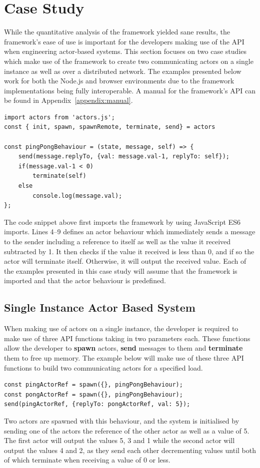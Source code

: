 \documentclass[oneside]{um-fict}
\begin{document}
\section{Case Study}
While the quantitative analysis of the framework yielded sane results, the framework's ease of use is important for the developers making use of the API when engineering actor-based systems. This section focuses on two case studies which make use of the framework to create two communicating actors on a single instance as well as over a distributed network. The examples presented below work for both the Node.js and browser environments due to the framework implementations being fully interoperable. A manual for the framework's API can be found in Appendix~\ref{appendix:manual}.
\newpage
\begin{lstlisting}    
import actors from 'actors.js';
const { init, spawn, spawnRemote, terminate, send} = actors

const pingPongBehaviour = (state, message, self) => {
    send(message.replyTo, {val: message.val-1, replyTo: self});
    if(message.val-1 < 0)
        terminate(self)
    else    
        console.log(message.val);
};
\end{lstlisting}
The code snippet above first imports the framework by using JavaScript ES6 imports. Lines 4--9 defines an actor behaviour which immediately sends a message to the sender including a reference to itself as well as the value it received subtracted by 1. It then checks if the value it received is less than 0, and if so the actor will terminate itself. Otherwise, it will output the received value. Each of the examples presented in this case study will assume that the framework is imported and that the actor behaviour is predefined. 
\subsection{Single Instance Actor Based System}
When making use of actors on a single instance, the developer is required to make use of three API functions taking in two parameters each. These functions allow the developer to \textbf{spawn} actors, \textbf{send} messages to them and \textbf{terminate} them to free up memory. The example below will make use of these three API functions to build two communicating actors for a specified load.
\begin{lstlisting}    
const pingActorRef = spawn({}, pingPongBehaviour);
const pongActorRef = spawn({}, pingPongBehaviour);
send(pingActorRef, {replyTo: pongActorRef, val: 5});
\end{lstlisting}
Two actors are spawned with this behaviour, and the system is initialised by sending one of the actors the reference of the other actor as well as a value of 5. The first actor will output the values 5, 3 and 1 while the second actor will output the values 4 and 2, as they send each other decrementing values until both of which terminate when receiving a value of 0 or less.
\end{document}
